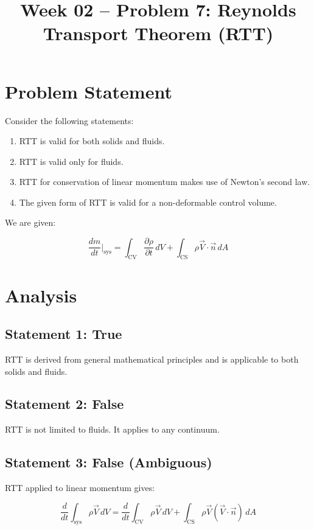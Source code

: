 \documentclass[12pt]{article}
\title{Week 02 -- Problem 7: Reynolds Transport Theorem (RTT)}
\date{}
\begin{document}
\maketitle

\section*{Problem Statement}

Consider the following statements:

\begin{enumerate}
    \item RTT is valid for both solids and fluids.
    \item RTT is valid only for fluids.
    \item RTT for conservation of linear momentum makes use of Newton’s second law.
    \item The given form of RTT is valid for a non-deformable control volume.
\end{enumerate}

We are given:

\[
\frac{dm}{dt}\Big|_{\text{sys}} = \int_{\text{CV}} \frac{\partial \rho}{\partial t} \, dV + \int_{\text{CS}} \rho \vec{V} \cdot \vec{n} \, dA
\]

\section*{Analysis}

\subsection*{Statement 1: True}

RTT is derived from general mathematical principles and is applicable to both solids and fluids.

\subsection*{Statement 2: False}

RTT is not limited to fluids. It applies to any continuum.

\subsection*{Statement 3: False (Ambiguous)}

RTT applied to linear momentum gives:

\[
\frac{d}{dt} \int_{\text{sys}} \rho \vec{V} \, dV = \frac{d}{dt} \int_{\text{CV}} \rho \vec{V} \, dV + \int_{\text{CS}} \rho \vec{V} (\vec{V} \cdot \vec{n}) \, dA
\]
\end{document}
